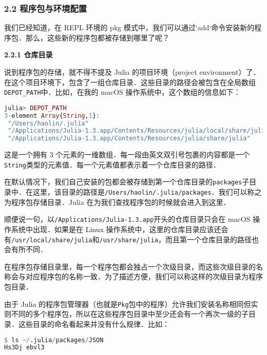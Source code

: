 
\subsubsection{2.2 程序包与环境配置}

我们已经知道，在 REPL 环境的 pkg 模式中，我们可以通过`add`命令安装新的程序包．那么，这些新的程序包都被存储到哪里了呢？

\textbf{2.2.1 仓库目录}

说到程序包的存储，就不得不提及 Julia 的项目环境（project environment）了．在这个项目环境下，包含了一组仓库目录．这些目录的路径会被包含在全局数组\verb|DEPOT_PATH|中．比如，在我的 macOS 操作系统中，这个数组的信息如下：

\begin{lstlisting}[language=julia]
julia> DEPOT_PATH
3-element Array{String,1}:
 "/Users/haolin/.julia"                                                  
 "/Applications/Julia-1.3.app/Contents/Resources/julia/local/share/julia"
 "/Applications/Julia-1.3.app/Contents/Resources/julia/share/julia" 
\end{lstlisting}

这是一个拥有 3 个元素的一维数组．每一段由英文双引号包裹的内容都是一个\verb|String|类型的元素值．每一个元素值都表示着一个仓库目录的路径．

在默认情况下，我们自己安装的包都会被存储到第一个仓库目录的\verb|packages|子目录中．在这里，该目录的路径是\verb|/Users/haolin/.julia/packages|．我们可以称之为程序包存储目录．Julia 在为我们查找程序包的时候就会进入到这里．

顺便说一句，以\verb|/Applications/Julia-1.3.app|开头的仓库目录只会在 macOS 操作系统中出现．如果是在 Linux 操作系统中，这里的仓库目录应该还会有\verb|/usr/local/share/julia|和\verb|/usr/share/julia|，而且第一个仓库目录的路径也会有所不同．

在程序包存储目录里，每一个程序包都会独占一个次级目录，而这些次级目录的名称会与对应程序包的名称一致．为了描述方便，我们可以称这样的次级目录为程序包目录．

由于 Julia 的程序包管理器（也就是\verb|Pkg|包中的程序）允许我们安装名称相同但实则不同的多个程序包，所以在这些程序包目录中至少还会有一个再次一级的子目录．这些目录的命名看起来并没有什么规律．比如：

\begin{lstlisting}[language=julia]
$ ls ~/.julia/packages/JSON
Hs3Dj ebvl3
\end{lstlisting}

